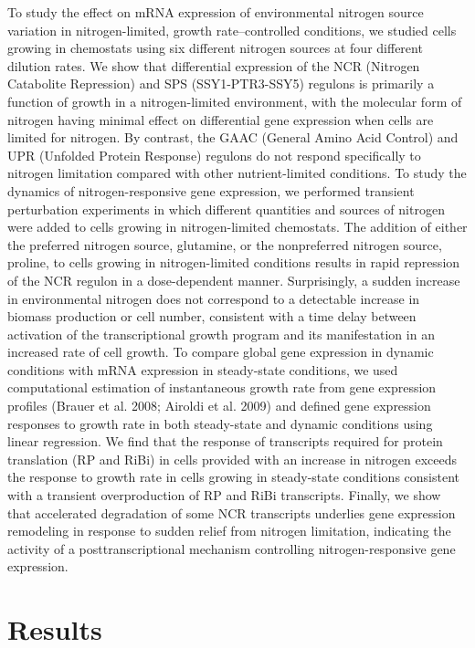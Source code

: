 To study the effect on mRNA expression of environmental
nitrogen source variation in nitrogen-limited, growth rate–controlled
conditions, we studied cells growing in chemostats using six different
nitrogen sources at four different dilution rates. We show that
differential expression of the NCR (Nitrogen Catabolite Repression)
and SPS (SSY1-PTR3-SSY5) regulons is primarily a function of growth in
a nitrogen-limited environment, with the molecular form of nitrogen
having minimal effect on differential gene expression when cells are
limited for nitrogen. By contrast, the GAAC (General Amino Acid
Control) and UPR (Unfolded Protein Response) regulons do not respond
specifically to nitrogen limitation compared with other
nutrient-limited conditions. To study the dynamics of
nitrogen-responsive gene expression, we performed transient
perturbation experiments in which different quantities and sources of
nitrogen were added to cells growing in nitrogen-limited chemostats.
The addition of either the preferred nitrogen source, glutamine, or
the nonpreferred nitrogen source, proline, to cells growing in
nitrogen-limited conditions results in rapid repression of the NCR
regulon in a dose-dependent manner. Surprisingly, a sudden increase in
environmental nitrogen does not correspond to a detectable increase in
biomass production or cell number, consistent with a time delay
between activation of the transcriptional growth program and its
manifestation in an increased rate of cell growth. To compare global
gene expression in dynamic conditions with mRNA expression in
steady-state conditions, we used computational estimation of
instantaneous growth rate from gene expression profiles (Brauer et al.
2008; Airoldi et al. 2009) and defined gene expression responses to
growth rate in both steady-state and dynamic conditions using linear
regression. We find that the response of transcripts required for
protein translation (RP and RiBi) in cells provided with an increase
in nitrogen exceeds the response to growth rate in cells growing in
steady-state conditions consistent with a transient overproduction of
RP and RiBi transcripts. Finally, we show that accelerated degradation
of some NCR transcripts underlies gene expression remodeling in
response to sudden relief from nitrogen limitation, indicating the
activity of a posttranscriptional mechanism controlling
nitrogen-responsive gene expression.  

\section{Results} 

